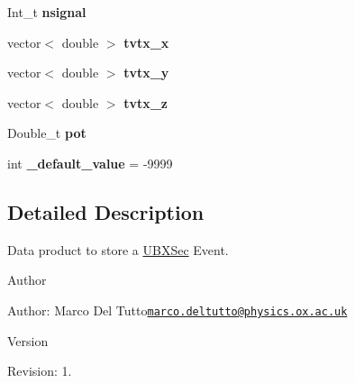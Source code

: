 \begin{DoxyCompactItemize}
\item 
\hypertarget{classUBXSecEvent_a6aff7f0ac0e26d4b80b117cb5797f1ab}{Int\-\_\-t {\bfseries nsignal}}\label{classUBXSecEvent_a6aff7f0ac0e26d4b80b117cb5797f1ab}

\item 
\hypertarget{classUBXSecEvent_a75b4a2318b7f7f187acdc33622a4795e}{vector$<$ double $>$ {\bfseries tvtx\-\_\-x}}\label{classUBXSecEvent_a75b4a2318b7f7f187acdc33622a4795e}

\item 
\hypertarget{classUBXSecEvent_aa6532549e8c9763ae285a98976a80a94}{vector$<$ double $>$ {\bfseries tvtx\-\_\-y}}\label{classUBXSecEvent_aa6532549e8c9763ae285a98976a80a94}

\item 
\hypertarget{classUBXSecEvent_afcae666a9433c56792d47c53856d66ac}{vector$<$ double $>$ {\bfseries tvtx\-\_\-z}}\label{classUBXSecEvent_afcae666a9433c56792d47c53856d66ac}

\item 
\hypertarget{classUBXSecEvent_ad783d4eedd7be14db4d5b7b9cb2d144a}{Double\-\_\-t {\bfseries pot}}\label{classUBXSecEvent_ad783d4eedd7be14db4d5b7b9cb2d144a}

\item 
\hypertarget{classUBXSecEvent_a88e5ff2c7d0db95750e980740231d80b}{int {\bfseries \-\_\-default\-\_\-value} = -\/9999}\label{classUBXSecEvent_a88e5ff2c7d0db95750e980740231d80b}

\end{DoxyCompactItemize}


\subsection{Detailed Description}
Data product to store a \hyperlink{classUBXSec}{U\-B\-X\-Sec} Event. 

\begin{DoxyAuthor}{Author}

\end{DoxyAuthor}
\begin{DoxyParagraph}{Author\-:}
Marco Del Tutto\href{mailto:marco.deltutto@physics.ox.ac.uk}{\tt marco.\-deltutto@physics.\-ox.\-ac.\-uk} 
\end{DoxyParagraph}


\begin{DoxyVersion}{Version}

\end{DoxyVersion}
\begin{DoxyParagraph}{Revision\-:}
1. 
\end{DoxyParagraph}


